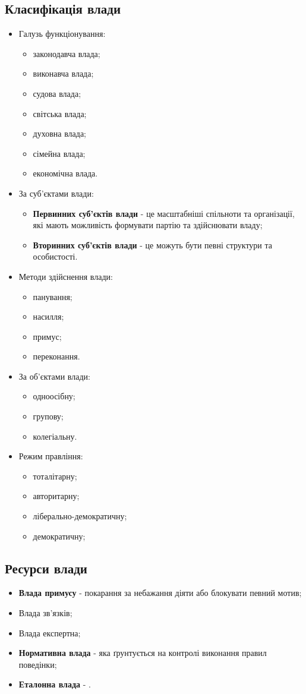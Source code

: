 \subsection{Класифікація влади}
\begin{itemize}
\item Галузь функціонування:
	\begin{itemize}
	\item законодавча влада;
	\item виконавча влада;
	\item судова влада;
	\item світська влада;
	\item духовна влада;
	\item сімейна влада;
	\item економічна влада.
	\end{itemize}
\item За суб’єктами влади:
	\begin{itemize}
	\item \textbf{Первинних суб’єктів влади} - це масштабніші спільноти та організації, які мають можливість формувати партію та здійснювати владу;
	\item \textbf{Вторинних суб’єктів влади} - це можуть бути певні структури та особистості.
	\end{itemize}
\item Методи здійснення влади:
	\begin{itemize}
	\item панування;
	\item насилля;
	\item примус;
	\item переконання.
	\end{itemize}
\item За об’єктами влади:
	\begin{itemize}
	\item одноосібну;
	\item групову;
	\item колегіальну.
	\end{itemize}
\item Режим правління:
	\begin{itemize}
	\item тоталітарну;
	\item авторитарну;
	\item ліберально-демократичну;
	\item демократичну;
	\end{itemize}
\end{itemize}
\subsection{Ресурси влади}
\begin{itemize}
\item \textbf{Влада примусу} - покарання за небажання діяти або блокувати певний мотив;
\item Влада зв’язків;
\item Влада експертна;
\item \textbf{Нормативна влада} - яка ґрунтується на контролі виконання правил поведінки;
\item \textbf{Еталонна влада} - .
\end{itemize}